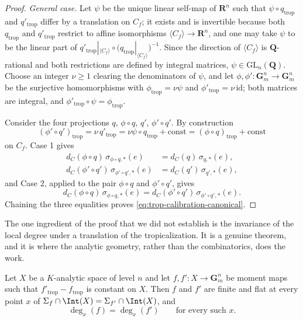 \begin{proof}
\emph{General case.} Let $\psi$ be the unique linear self-map of
$\mathbf R^n$ such that $\psi\circ q_{\mathrm{trop}}$ and
$q'_{\mathrm{trop}}$ differ by a translation on $C_f$; it exists and is
invertible because both $q_{\mathrm{trop}}$ and $q'_{\mathrm{trop}}$ restrict
to affine isomorphisms $\langle C_f\rangle\to\mathbf R^n$, and one may take
$\psi$ to be the linear part of
$q'_{\mathrm{trop}}|_{\langle C_f\rangle}\circ
 \bigl(q_{\mathrm{trop}}|_{\langle C_f\rangle}\bigr)^{-1}$.
Since the direction of $\langle C_f\rangle$ is $\mathbf Q$-rational and both restrictions are
defined by integral matrices, $\psi\in\mathrm{GL}_n(\mathbf Q)$. Choose an
integer $\nu\ge1$ clearing the denominators of $\psi$, and let
$\phi,\phi':\mathbf G_m^n\to\mathbf G_m^n$ be the surjective homomorphisms
with $\phi_{\mathrm{trop}}=\nu\psi$ and
$\phi'_{\mathrm{trop}}=\nu\,\mathrm{id}$; both matrices are integral, and
$\phi'_{\mathrm{trop}}\circ\psi=\phi_{\mathrm{trop}}$.

Consider the four projections $q$, $\phi\circ q$, $q'$, $\phi'\circ q'$. By
construction
\[
 (\phi'\circ q')_{\mathrm{trop}}
 =\nu\,q'_{\mathrm{trop}}
 =\nu\psi\circ q_{\mathrm{trop}}+\text{const}
 =(\phi\circ q)_{\mathrm{trop}}+\text{const}
\]
on $C_f$. Case 1 gives
\[
 \begin{aligned}
  d_C(\phi\circ q)\,\sigma_{\phi\circ q,*}(e)
   &=d_C(q)\,\sigma_{q,*}(e),\\
  d_C(\phi'\circ q')\,\sigma_{\phi'\circ q',*}(e)
   &=d_C(q')\,\sigma_{q',*}(e),
 \end{aligned}
\]
and Case 2, applied to the pair $\phi\circ q$ and $\phi'\circ q'$, gives
\[
 d_C(\phi\circ q)\,\sigma_{\phi\circ q,*}(e)
 =d_C(\phi'\circ q')\,\sigma_{\phi'\circ q',*}(e).
\]
Chaining the three equalities proves
\eqref{eq:trop-calibration-canonical}.
\end{proof}

The one ingredient of the proof that we did not establish is the invariance
of the local degree under a translation of the tropicalization. It is a
genuine theorem, and it is where the analytic geometry, rather than the
combinatorics, does the work.

\begin{theorem}
\label{thm:trop-degree-translation}
Let $X$ be a $K$-analytic space of level $n$ and let
$f,f':X\to\mathbf G_m^n$ be moment maps such that
$f'_{\mathrm{trop}}-f_{\mathrm{trop}}$ is constant on $X$. Then $f$ and
$f'$ are finite and flat at every point $x$ of
$\Sigma_f\cap\Int(X)=\Sigma_{f'}\cap\Int(X)$, and
\[
 \deg_x(f)=\deg_x(f')\qquad\text{for every such }x.
\]
\end{theorem}

